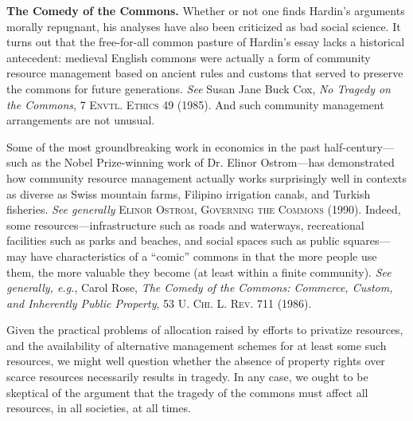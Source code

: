\item \textbf{The Comedy of the Commons.} Whether or not one finds Hardin's
arguments morally repugnant, his analyses have also been criticized as bad
social science. It turns out that the free-for-all common pasture of Hardin's
essay lacks a historical antecedent: medieval English commons were actually a
form of community resource management based on ancient rules and customs that
served to preserve the commons for future generations. \textit{See} Susan Jane
Buck Cox, \textit{No Tragedy on the Commons}, 7 \textsc{Envtl. Ethics} 49
(1985). And such community management arrangements are not unusual. 

Some of the most groundbreaking work in economics in the past
half-century---such as the Nobel Prize-winning work of Dr. Elinor Ostrom---has
demonstrated how community resource management actually works surprisingly well
in contexts as diverse as Swiss mountain farms, Filipino irrigation canals, and
Turkish fisheries. \textit{See generally} \textsc{Elinor Ostrom, Governing the
Commons} (1990). Indeed, some resources---infrastructure such as roads and
waterways, recreational facilities such as parks and beaches, and social spaces
such as public squares---may have characteristics of a ``comic'' commons in that
the more people use them, the more valuable they become (at least within a
finite community). \textit{See generally, e.g.}, Carol Rose, \textit{The Comedy
of the Commons: Commerce, Custom, and Inherently Public Property}, 53 \textsc{U.
Chi. L. Rev.} 711 (1986). 

Given the practical problems of allocation raised by efforts to privatize
resources, and the availability of alternative management schemes for at least
some such resources, we might well question whether the absence of property
rights over scarce resources necessarily results in tragedy. In any case, we
ought to be skeptical of the argument that the tragedy of the commons must
affect all resources, in all societies, at all times.

